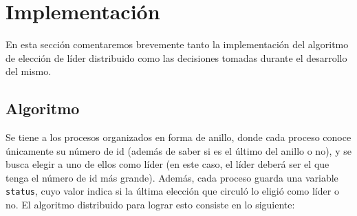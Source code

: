 \section{Implementación}

En esta sección comentaremos brevemente tanto la implementación del algoritmo de
elección de líder distribuido como las decisiones tomadas durante
el desarrollo del mismo.

\subsection{Algoritmo}

Se tiene a los procesos organizados en forma de anillo, donde cada proceso
conoce únicamente su número de id (además de saber si es el último del anillo
o no), y se busca elegir a uno de ellos como líder (en este caso, el líder
deberá ser el que tenga el número de id más grande). Además, cada proceso
guarda una variable \verb|status|, cuyo valor indica si la última elección
que circuló lo eligió como líder o no.
El algoritmo distribuido para lograr esto consiste en lo siguiente:

